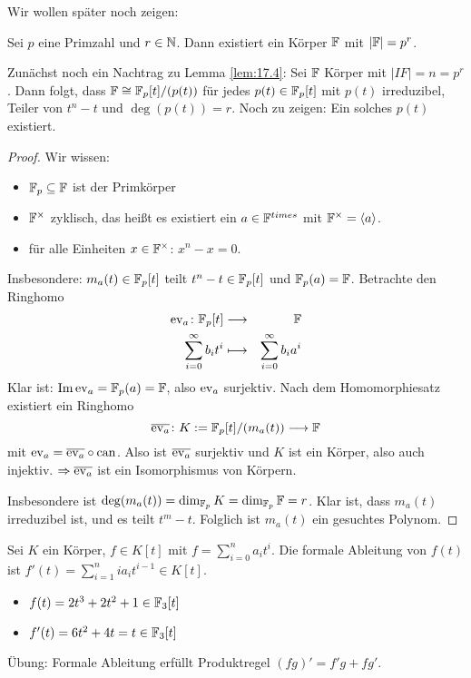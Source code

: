 \documentclass[12pt,a4paper]{scrartcl}
\begin{document}
Wir wollen später noch zeigen:
\begin{satz}\label{thm:18.1}
	Sei $p$ eine Primzahl und $r\in\mathbb N$. Dann existiert ein Körper $\mathbb F$ mit $|\mathbb F| = p^r$.
\end{satz}

\vspace{3mm}
Zunächst noch ein Nachtrag zu Lemma \ref{lem:17.4}: Sei $\mathbb F$ Körper mit $|IF| = n = p^r$. Dann folgt, dass $\mathbb F\cong \mathbb F_p[t]/(p(t))$ für jedes $p(t)\in\mathbb F_p[t]$ mit $p(t)$ irreduzibel, Teiler von $t^n-t$ und $\deg(p(t)) = r$. Noch zu zeigen: Ein solches $p(t)$ existiert.
\begin{proof}
	Wir wissen:
	\begin{itemize}
		\item $\mathbb F_p\subseteq \mathbb F$ ist der Primkörper
		\item $\mathbb F^{\times}$ zyklisch, das heißt es existiert ein $a\in\mathbb F^{times}$ mit $\mathbb F^{\times} = \langle a\rangle$.
		\item für alle Einheiten $x\in \mathbb F^{\times}$: $x^n-x = 0$.
	\end{itemize}
	Insbesondere: $m_a(t)\in\mathbb F_p[t]$ teilt $t^n-t\in\mathbb F_p[t]$ und $\mathbb F_p(a) = \mathbb F$. Betrachte den Ringhomo
	\begin{eqnarray*}
		\operatorname{ev}_a\colon \mathbb F_p[t] & \longrightarrow & \mathbb F\\
		\sum_{i = 0}^{\infty} b_it^i & \longmapsto &\sum_{i = 0}^{\infty}b_ia^i
	\end{eqnarray*}
	Klar ist: $\operatorname{Im}\operatorname{ev}_a = \mathbb F_p(a) = \mathbb F$, also $\operatorname{ev}_a$ surjektiv. Nach dem Homomorphiesatz existiert ein Ringhomo
	$$\overline{\operatorname{ev}_a}\colon K := \mathbb F_p[t]/(m_a(t))\longrightarrow \mathbb F$$
	mit $\operatorname{ev}_a = \overline{\operatorname{ev}_a}\circ\operatorname{can}$. Also ist $\overline{\operatorname{ev}_a}$ surjektiv und $K$ ist ein Körper, also auch injektiv. $\Rightarrow \overline{\operatorname{ev}_a}$ ist ein Isomorphismus von Körpern.
	
	Insbesondere ist $\deg(m_a(t)) = \dim_{\mathbb F_p}K = \dim_{\mathbb F_p}\mathbb F= r$. Klar ist, dass $m_a(t)$ irreduzibel ist, und es teilt $t^m-t$. Folglich ist $m_a(t)$ ein gesuchtes Polynom.
\end{proof}

\begin{defi}
	Sei $K$ ein Körper, $f\in K[t]$ mit $f = \sum_{i = 0}^n a_it^i$. Die formale Ableitung von $f(t)$ ist $f'(t) = \sum_{i = 1}^{n} ia_it^{i-1}\in K[t]$. 
\end{defi}
\begin{bsp}
	\leavevmode
	\begin{itemize}
		\item[] $f(t) = 2t^3+2t^2+1\in \mathbb F_3[t]$
		\item[] $f'(t) = 6t^2 + 4t = t\in\mathbb F_3[t]$
	\end{itemize}
\end{bsp}
Übung: Formale Ableitung erfüllt Produktregel $(fg)' = f'g+fg'$.
\end{document}
